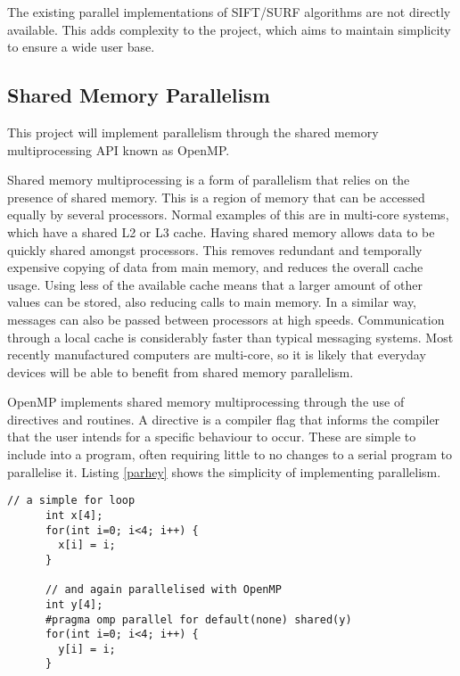 \documentclass[../main.tex]{subfiles}
\begin{document}
    The existing parallel implementations of SIFT/SURF algorithms are not directly available.
    This adds complexity to the project, which aims to maintain simplicity to ensure a wide user base.
    
  \subsection{Shared Memory Parallelism}
    This project will implement parallelism through the shared memory multiprocessing API known as OpenMP.

    Shared memory multiprocessing is a form of parallelism that relies on the presence of shared memory.
    This is a region of memory that can be accessed equally by several processors.
    Normal examples of this are in multi-core systems, which have a shared L2 or L3 cache.
    Having shared memory allows data to be quickly shared amongst processors.
    This removes redundant and temporally expensive copying of data from main memory, and reduces the overall cache usage.
    Using less of the available cache means that a larger amount of other values can be stored, also reducing calls to main memory.
    In a similar way, messages can also be passed between processors at high speeds.
    Communication through a local cache is considerably faster than typical messaging systems.
    Most recently manufactured computers are multi-core, so it is likely that everyday devices will be able to benefit from shared memory parallelism.

    OpenMP implements shared memory multiprocessing through the use of directives and routines.
    A directive is a compiler flag that informs the compiler that the user intends for a specific behaviour to occur.
    These are simple to include into a program, often requiring little to no changes to a serial program to parallelise it.
    Listing \ref{parhey} shows the simplicity of implementing parallelism.
    \lstset{language=C++}
    \begin{lstlisting}[caption = 'A simple loop parallelised with OpenMP', label=parhey]
      // a simple for loop
      int x[4];
      for(int i=0; i<4; i++) {
        x[i] = i;
      }

      // and again parallelised with OpenMP
      int y[4];
      #pragma omp parallel for default(none) shared(y)
      for(int i=0; i<4; i++) {
        y[i] = i;
      }
    \end{lstlisting}
\end{document}
